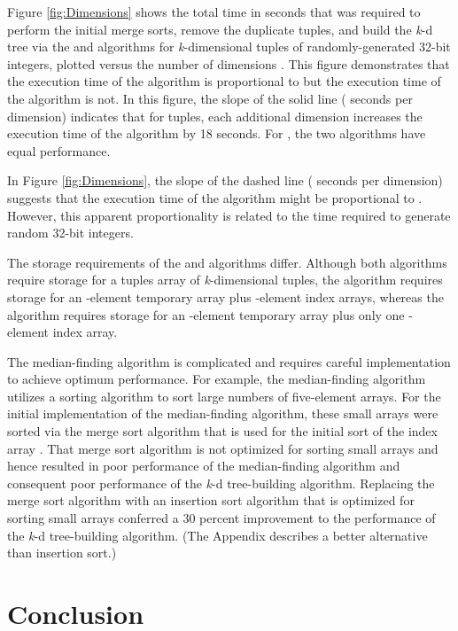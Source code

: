 \documentclass{sig-alternate}
\begin{document}
Figure \ref{fig:Dimensions} shows the total time in seconds that was required to perform the initial merge sorts, remove the duplicate tuples, and build the \emph{k}-d tree via the  and  algorithms for  \emph{k}-dimensional tuples of randomly-generated 32-bit integers, plotted versus the number of dimensions .  This figure demonstrates that the execution time of the  algorithm is proportional to  but the execution time of the  algorithm is not.  In this figure, the slope of the solid line ( seconds per dimension) indicates that for  tuples, each additional dimension increases the execution time of the  algorithm by 18 seconds.  For , the two algorithms have equal performance.

In Figure \ref{fig:Dimensions}, the slope of the dashed line ( seconds per dimension) suggests that the execution time of the  algorithm might be proportional to .  However, this apparent proportionality is related to the time required to generate random 32-bit integers.

The storage requirements of the  and  algorithms differ.  Although both algorithms require storage for a tuples array of  \emph{k}-dimensional tuples, the  algorithm requires storage for an -element temporary array plus  -element index arrays, whereas the  algorithm requires storage for an -element temporary array plus only one -element index array.
  
The  median-finding algorithm is complicated and requires careful implementation to achieve optimum performance.  For example, the median-finding algorithm utilizes a sorting algorithm to sort large numbers of five-element arrays.  For the initial implementation of the  median-finding algorithm, these small arrays were sorted via the merge sort algorithm that is used for the initial sort of the index array \cite{Sedgewick}.  That merge sort algorithm is not optimized for sorting small arrays and hence resulted in poor performance of the  median-finding algorithm and consequent poor performance of the  \emph{k}-d tree-building algorithm.  Replacing the merge sort algorithm with an insertion sort algorithm that is optimized for sorting small arrays \cite{Bentley2} conferred a 30 percent improvement to the performance of the   \emph{k}-d tree-building algorithm.  (The Appendix describes a better alternative than insertion sort.)

\section{Conclusion}
\label{sec:conclusion}
\end{document}
